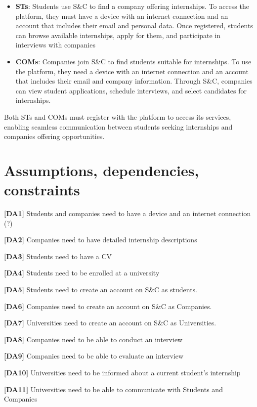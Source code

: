 \begin{itemize}
    \item \textbf{STs}: Students use S\&C to find a company offering internships. To access the platform, they must have a device with an internet connection and an account that includes their email and personal data. Once registered, students can browse available internships, apply for them, and participate in interviews with 
    companies

    \item \textbf{COMs}:  Companies join S\&C to find students suitable for internships. To use the platform, they need a device with an internet connection and an account that includes their email and company information. Through S\&C, companies can view student applications, schedule interviews, and select candidates for internships.
\end{itemize}

Both STs and COMs must register with the platform to access its services, enabling seamless communication between students seeking internships and companies offering opportunities.

\section{Assumptions, dependencies, constraints}
\textbf{[DA1] }Students and companies need to have a device and an internet connection (?)

\textbf{[DA2]} Companies need to have detailed internship descriptions

\textbf{[DA3]} Students need to have a CV

\textbf{[DA4]} Students need to be enrolled at a university 

\textbf{[DA5]} Students need to create an account on S\&C as students.

\textbf{[DA6]} Companies need to create an account on S\&C as Companies.

\textbf{[DA7]} Universities need to create an account on S\&C as Universities.

\textbf{[DA8]} Companies need to be able to conduct an interview

\textbf{[DA9]} Companies need to be able to evaluate an interview

\textbf{[DA10]} Universities need to be informed about a current student's internship

\textbf{[DA11]} Universities need to be able to communicate with Students and Companies
